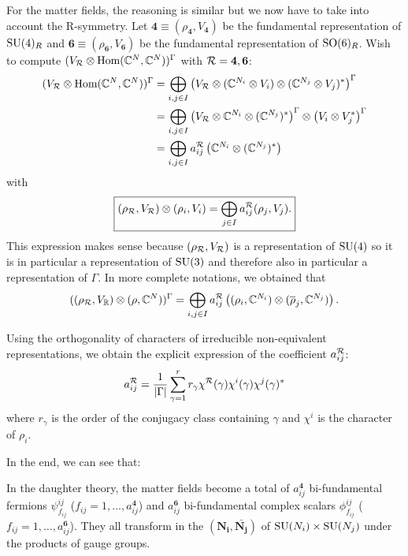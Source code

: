             For the matter fields, the reasoning is similar but we now have to take into account the R-symmetry. Let $\boldsymbol{4}\equiv(\rho_{\boldsymbol{4}},V_{\boldsymbol{4}})$ be the fundamental representation of $\text{SU}(4)_R$ and $\boldsymbol{6}\equiv(\rho_{\boldsymbol{6}},V_{\boldsymbol{6}})$ be the fundamental representation of $\text{SO}(6)_R$. Wish to compute $(V_{\mathcal{R}}\otimes\text{Hom}(\mathbb{C}^N,\mathbb{C}^N))^\Gamma$ with $\mathcal{R}=\boldsymbol{4},\boldsymbol{6}$:
            \begin{align}
                (V_{\mathcal{R}}\otimes\text{Hom}(\mathbb{C}^N,\mathbb{C}^N))^\Gamma &= \bigoplus_{i,j\in I} \left(V_{\mathcal{R}}\otimes (\mathbb{C}^{N_i}\otimes V_i)\otimes(\mathbb{C}^{N_j}\otimes V_j)^*\right)^\Gamma\\
                &= \bigoplus_{i,j\in I} \left(V_{\mathcal{R}}\otimes\mathbb{C}^{N_i}\otimes(\mathbb{C}^{N_j})^*\right)^\Gamma\otimes\left(V_i\otimes V^*_j\right)^\Gamma\\
                &= \bigoplus_{i,j\in I}a^{\mathcal{R}}_{ij}\left(\mathbb{C}^{N_i}\otimes(\mathbb{C}^{N_j})^*\right)
            \end{align}
            with
            \begin{equation}
                \boxed{(\rho_{\mathcal{R}},V_{\mathcal{R}})\otimes(\rho_i,V_i)=\bigoplus_{j\in I}a^{\mathcal{R}}_{ij}(\rho_j,V_j).}\label{eq:defaij}
            \end{equation}
            This expression makes sense because $(\rho_{\mathcal{R}},V_{\mathcal{R}})$ is a representation of $\text{SU}(4)$ so it is in particular a representation of $\text{SU}(3)$ and therefore also in particular a representation of $\Gamma$. In more complete notations, we obtained that
            \begin{equation}
                ((\rho_{\mathcal{R}},V_{\mathbb{R}})\otimes(\rho,\mathbb{C}^N))^\Gamma = \bigoplus_{i,j\in I}a^{\mathcal{R}}_{ij}\left((\rho_i,\mathbb{C}^{N_i})\otimes(\overline{\rho}_j,\mathbb{C}^{N_j})\right).\label{eq:resdecomp}
            \end{equation}
            

            Using the orthogonality of characters of irreducible non-equivalent representations, we obtain the explicit expression of the coefficient $a^{\mathcal{R}}_{ij}$:
            \begin{equation}
                a^{\mathcal{R}}_{ij} = \frac{1}{\abs{\Gamma}}\sum^r_{\gamma=1} r_\gamma\chi^{\mathcal{R}}(\gamma)\chi^i(\gamma)\chi^j(\gamma)^*
            \end{equation}
            where $r_\gamma$ is the order of the conjugacy class containing $\gamma$ and $\chi^i$ is the character of $\rho_i$.

            In the end, we can see that:
            \begin{result}
                In the daughter theory, the matter fields become a total of $a^{\boldsymbol{4}}_{ij}$ bi-fundamental fermions $\psi^{ij}_{f_{ij}}$ ($f_{ij}=1,\dots,a^{\boldsymbol{4}}_{ij}$) and $a^{\boldsymbol{6}}_{ij}$ bi-fundamental complex scalars $\phi^{ij}_{f_{ij}}$ ($f_{ij}=1,\dots,a^{\boldsymbol{6}}_{ij}$). They all transform in the $(\boldsymbol{\textbf{N}_i},\bar{\boldsymbol{\textbf{N}_j}})$ of $\text{SU}(N_i)\times\text{SU}(N_j)$ under the products of gauge groups.
            \end{result}

